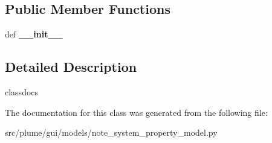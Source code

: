 \subsection*{Public Member Functions}
\begin{DoxyCompactItemize}
\item 
def {\bfseries \+\_\+\+\_\+init\+\_\+\+\_\+}\hypertarget{classplume-creator_1_1src_1_1plume_1_1gui_1_1models_1_1note__system__property__model_1_1_note_system_property_model_a6e3d77dac18ac5cd0ad0a05c74ec1aa5}{}\label{classplume-creator_1_1src_1_1plume_1_1gui_1_1models_1_1note__system__property__model_1_1_note_system_property_model_a6e3d77dac18ac5cd0ad0a05c74ec1aa5}

\end{DoxyCompactItemize}


\subsection{Detailed Description}
classdocs 

The documentation for this class was generated from the following file\+:\begin{DoxyCompactItemize}
\item 
src/plume/gui/models/note\+\_\+system\+\_\+property\+\_\+model.\+py\end{DoxyCompactItemize}
